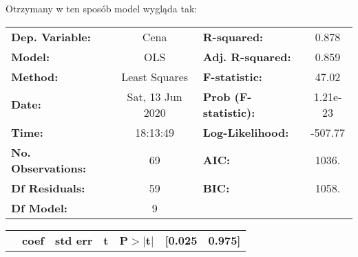 \documentclass[11pt,a4paper]{article}
\begin{document}
		Otrzymany w ten sposób model wygląda tak:\\
		\begin{center}
			\begin{tabular}{lclc}
				 
				\textbf{Dep. Variable:}           &       Cena       & \textbf{  R-squared:         } &     0.878   \\
				\textbf{Model:}                   &       OLS        & \textbf{  Adj. R-squared:    } &     0.859   \\
				\textbf{Method:}                  &  Least Squares   & \textbf{  F-statistic:       } &     47.02   \\
				\textbf{Date:}                    & Sat, 13 Jun 2020 & \textbf{  Prob (F-statistic):} &  1.21e-23   \\
				\textbf{Time:}                    &     18:13:49     & \textbf{  Log-Likelihood:    } &   -507.77   \\
				\textbf{No. Observations:}        &          69      & \textbf{  AIC:               } &     1036.   \\
				\textbf{Df Residuals:}            &          59      & \textbf{  BIC:               } &     1058.   \\
				\textbf{Df Model:}                &           9      & \textbf{                     } &             \\
				 
			\end{tabular}
			\begin{tabular}{lcccccc}
				& \textbf{coef} & \textbf{std err} & \textbf{t} & \textbf{P$> |$t$|$} & \textbf{[0.025} & \textbf{0.975]}  \\
				 

\end{tabular}
\end{center}
\end{document}
